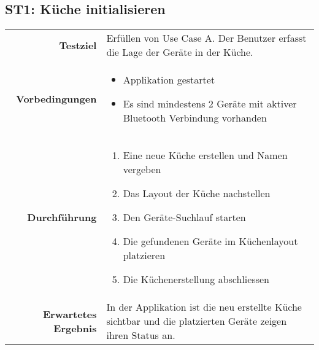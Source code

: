 \subsection{ST1: Küche initialisieren}
\begin{table}[H]
\begin{tabularx}{\textwidth}{r X }
\textbf{Testziel} & Erfüllen von Use Case A. Der Benutzer erfasst die Lage der Geräte in der Küche. \\
\textbf{Vorbedingungen} & \begin{itemize}
\item Applikation gestartet
\item Es sind mindestens 2 Geräte mit aktiver Bluetooth Verbindung vorhanden
\end{itemize} \\
\textbf{Durchführung} & \begin{enumerate}
\item Eine neue Küche erstellen und Namen vergeben
\item Das Layout der Küche nachstellen
\item Den Geräte-Suchlauf starten
\item Die gefundenen Geräte im Küchenlayout platzieren
\item Die Küchenerstellung abschliessen
\end{enumerate} \\
\textbf{Erwartetes Ergebnis} & In der Applikation ist die neu erstellte Küche sichtbar und die platzierten Geräte zeigen ihren Status an.\\
\end{tabularx}
\end{table}

